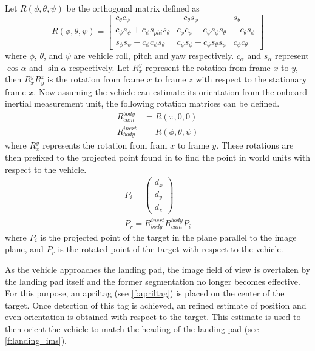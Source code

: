 Let $R\left(\phi, \theta, \psi\right)$ be the orthogonal matrix defined as
\begin{equation}
    R(\phi,\theta,\psi) = 
    \begin{bmatrix}
            c_{\theta}c_{\psi}                           & -c_{\theta}s_{\phi}                           & s_{\theta}\\
            c_{\phi}s_{\psi} + c_{\psi}s_{phi}s_{\theta} & c_{\phi}c_{\psi} - c_{\psi}s_{\phi}s_{\theta} & -c_{\theta}s_{\phi}\\
            s_{\phi}s_{\psi} -c_{\phi}c_{\psi}s_{\theta} & c_{\psi}s_{\phi} + c_{\phi}s_{\theta}s_{\psi} & c_{\phi}c_{\theta}
    \end{bmatrix}
\end{equation}
where $\phi$, $\theta$, and $\psi$ are vehicle roll, pitch and yaw respectively. $c_{\alpha}$ and $s_{\alpha}$
represent $\cos{\alpha}$ and $\sin{\alpha}$ respectively. Let $R_x^y$ represent the rotation from frame $x$ to
$y$, then $R_x^yR_y^z$ is the rotation from frame $x$ to frame $z$ with respect to the stationary frame $x$.
Now assuming the vehicle can estimate its orientation from the onboard inertial measurement unit, the
following rotation matrices can be defined.
\begin{align}
    R_{cam}^{body}   & = R(\pi, 0, 0)\label{e:rot_cam_bod}\\
    R_{body}^{inert} & = R(\phi, \theta, \psi)\label{e:rot_body_inert}
\end{align}
where $R_{x}^{y}$ represents the rotation from fram $x$ to frame $y$. These rotations are then prefixed to the
projected point found  in  to find the point in world units with respect
to the vehicle.
\begin{align}\label{e:rotate}
    P_i = \begin{pmatrix}d_x\\d_y\\d_z\end{pmatrix}\\
    P_r = R_{body}^{inert}R_{cam}^{body}P_i
\end{align}
where $P_i$ is the projected point of the target in the plane parallel to the image plane, and $P_r$ is the
rotated point of the target with respect to the vehicle.

As the vehicle approaches the landing pad, the image field of view is overtaken by the landing pad itself and
the former segmentation no longer becomes effective. For this purpose, an apriltag\cite{olson2011tags} (see
\cref{f:apriltag}) is placed on the center of the target. Once detection of this tag is achieved, an refined
estimate of position and even orientation is obtained with respect to the target. This estimate is used to
then orient the vehicle to match the heading of the landing pad (see \cref{f:landing_ims}).

